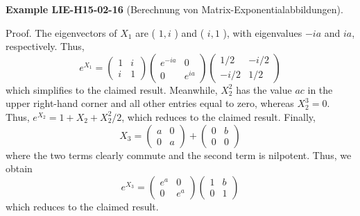 \documentclass[10pt, letterpaper]{article}
\newcommand{\CustomHeading}[3]{%
  \par\medskip\noindent%
  \textbf{#1 #2} \textnormal{(#3)}.\enskip%
}
\newenvironment{EXA}[2]{\begin{unitbox}\CustomHeading{Example}{#1}{#2}}{\end{unitbox}}
\begin{document}
\begin{EXA}{LIE-H15-02-16}{Berechnung von Matrix-Exponentialabbildungen}
Proof. The eigenvectors of $X_{1}$ are ( $1, i$ ) and ( $i, 1$ ), with eigenvalues $-i a$ and $i a$, respectively. Thus,
$$
e^{X_{1}}=\left(\begin{array}{cc}
1 & i \\
i & 1
\end{array}\right)\left(\begin{array}{cc}
e^{-i a} & 0 \\
0 & e^{i a}
\end{array}\right)\left(\begin{array}{rr}
1 / 2 & -i / 2 \\
-i / 2 & 1 / 2
\end{array}\right)
$$
which simplifies to the claimed result. Meanwhile, $X_{2}^{2}$ has the value $a c$ in the upper right-hand corner and all other entries equal to zero, whereas $X_{2}^{3}=0$. Thus, $e^{X_{2}}= 1+X_{2}+X_{2}^{2} / 2$, which reduces to the claimed result. Finally,
$$
X_{3}=\left(\begin{array}{cc}
a & 0 \\
0 & a
\end{array}\right)+\left(\begin{array}{ll}
0 & b \\
0 & 0
\end{array}\right)
$$
where the two terms clearly commute and the second term is nilpotent. Thus, we obtain
$$
e^{X_{3}}=\left(\begin{array}{cc}
e^{a} & 0 \\
0 & e^{a}
\end{array}\right)\left(\begin{array}{ll}
1 & b \\
0 & 1
\end{array}\right)
$$
which reduces to the claimed result.
\end{EXA}
\end{document}
